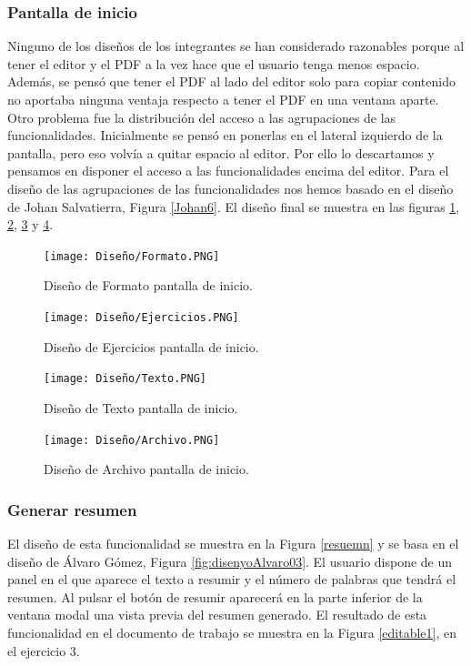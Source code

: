 \subsubsection{Pantalla de inicio}
Ninguno de los diseños de los integrantes se han considerado razonables porque al tener el editor y el PDF a la vez hace que el usuario tenga menos espacio. Además, se pensó que tener el PDF al lado del editor solo para copiar contenido no aportaba ninguna ventaja respecto a tener el PDF en una ventana aparte. Otro problema fue la distribución del acceso a las agrupaciones de las funcionalidades. Inicialmente se pensó en ponerlas en el lateral izquierdo de la pantalla, pero eso volvía a quitar espacio al editor. Por ello lo descartamos y pensamos en disponer el acceso a las funcionalidades encima del editor. Para el diseño de las agrupaciones de las funcionalidades nos hemos basado en el diseño de Johan Salvatierra, Figura \ref{Johan6}. El diseño final se  muestra en las figuras \ref{Forato}, \ref{ejercicios}, \ref{texto} y \ref{archivo}.

\begin{figure}[ht!]
  \centering
  \texttt{[image: Diseño/Formato.PNG]}
  \caption{Diseño de Formato pantalla de inicio.}
  \label{Forato}
\end{figure}

\begin{figure}[ht!]
  \centering
  \texttt{[image: Diseño/Ejercicios.PNG]}
  \caption{Diseño de Ejercicios pantalla de inicio.}
  \label{ejercicios}
\end{figure}

\begin{figure}[ht!]
  \centering
  \texttt{[image: Diseño/Texto.PNG]}
  \caption{Diseño de Texto pantalla de inicio.}
  \label{texto}
\end{figure}

\begin{figure}[ht!]
  \centering
  \texttt{[image: Diseño/Archivo.PNG]}
  \caption{Diseño de Archivo pantalla de inicio.}
  \label{archivo}
\end{figure}

\subsubsection{Generar resumen}
El diseño de esta funcionalidad se muestra en la Figura \ref{resuemn} y se basa en el diseño de Álvaro Gómez, Figura \ref{fig:disenyoAlvaro03}. El usuario dispone de un panel en el que aparece el texto a resumir y el número de palabras que tendrá el resumen. Al pulsar el botón de resumir aparecerá en la parte inferior de la ventana modal una vista previa del resumen generado. El resultado de esta funcionalidad en el documento de trabajo se muestra en la Figura \ref{editable1}, en el ejercicio 3.

